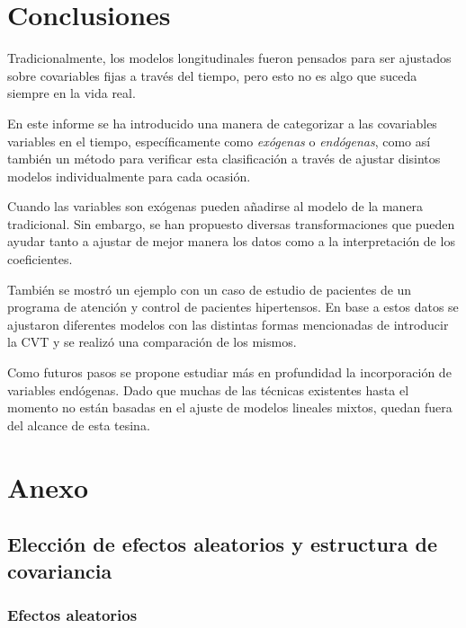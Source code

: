 \documentclass[spanish]{article}
\numberwithin{figure}{subsection}
\numberwithin{equation}{subsection}
\numberwithin{table}{subsection}
\begin{document}
\newpage

\section{Conclusiones}

Tradicionalmente, los modelos longitudinales fueron pensados para ser ajustados
sobre covariables fijas a través del tiempo, pero esto no es algo que suceda
siempre en la vida real.

En este informe se ha introducido una manera de categorizar a las covariables
variables en el tiempo, específicamente como \textit{exógenas} o
\textit{endógenas}, como así también un método para verificar esta clasificación
a través de ajustar disintos modelos individualmente para cada ocasión.

Cuando las variables son exógenas pueden añadirse al modelo de la manera
tradicional. Sin embargo, se han propuesto diversas transformaciones que pueden
ayudar tanto a ajustar de mejor manera los datos como a la interpretación de los
coeficientes.

También se mostró un ejemplo con un caso de estudio de pacientes de un programa
de atención y control de pacientes hipertensos. En base a estos datos se
ajustaron diferentes modelos con las distintas formas mencionadas de introducir
la CVT y se realizó una comparación de los mismos.

Como futuros pasos se propone estudiar más en profundidad la incorporación
de variables endógenas. Dado que muchas de las técnicas existentes hasta el
momento no están basadas en el ajuste de modelos lineales mixtos, quedan fuera
del alcance de esta tesina.

\newpage

\section{Anexo}

\subsection{Elección de efectos aleatorios y estructura de covariancia}
\label{eleccion_efectos_aleatorios}

\subsubsection{Efectos aleatorios}
\end{document}
